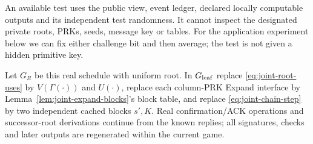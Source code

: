 An available test uses the public view, event ledger, declared locally
computable outputs and its independent test randomness. It cannot inspect
the designated private roots, PRKs, seeds, message key or tables. For the
application experiment below we can fix either challenge bit and then
average; the test is not given a hidden primitive key.

Let $G_R$ be this real schedule with uniform root. In $G_{\rm leaf}$ replace
\eqref{eq:joint-root-uses} by $V(\Gamma(\cdot))$ and $U(\cdot)$, replace each
column-PRK Expand interface by Lemma~\ref{lem:joint-expand-blocks}'s block
table, and replace \eqref{eq:joint-chain-step} by two independent cached
blocks $s',K$. Real confirmation/ACK operations and successor-root
derivations continue from the known replies; all signatures, checks and
later outputs are regenerated within the current game.

